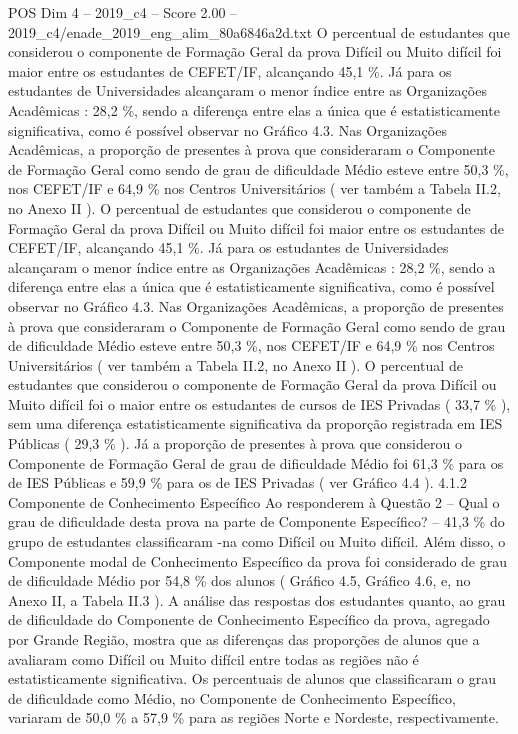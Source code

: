 \begin{textsample}{POS Dim 4 – 2019\_c4 – Score 2.00 – 2019\_c4/enade\_2019\_eng\_alim\_80a6846a2d.txt}
O percentual de estudantes que considerou o componente de Formação Geral da prova Difícil ou Muito difícil foi maior entre os estudantes de CEFET/IF, alcançando 45,1 \%.
Já para os estudantes de Universidades alcançaram o menor índice entre as Organizações Acadêmicas : 28,2 \%, sendo a diferença entre elas a única que é estatisticamente significativa, como é possível observar no Gráfico 4.3.
Nas Organizações Acadêmicas, a proporção de presentes à prova que consideraram o Componente de Formação Geral como sendo de grau de dificuldade Médio esteve entre 50,3 \%, nos CEFET/IF e 64,9 \% nos Centros Universitários ( ver também a Tabela II.2, no Anexo II ).
O percentual de estudantes que considerou o componente de Formação Geral da prova Difícil ou Muito difícil foi maior entre os estudantes de CEFET/IF, alcançando 45,1 \%.
Já para os estudantes de Universidades alcançaram o menor índice entre as Organizações Acadêmicas : 28,2 \%, sendo a diferença entre elas a única que é estatisticamente significativa, como é possível observar no Gráfico 4.3.
Nas Organizações Acadêmicas, a proporção de presentes à prova que consideraram o Componente de Formação Geral como sendo de grau de dificuldade Médio esteve entre 50,3 \%, nos CEFET/IF e 64,9 \% nos Centros Universitários ( ver também a Tabela II.2, no Anexo II ).
O percentual de estudantes que considerou o componente de Formação Geral da prova Difícil ou Muito difícil foi o maior entre os estudantes de cursos de IES Privadas ( 33,7 \% ), sem uma diferença estatisticamente significativa da proporção registrada em IES Públicas ( 29,3 \% ).
Já a proporção de presentes à prova que considerou o Componente de Formação Geral de grau de dificuldade Médio foi 61,3 \% para os de IES Públicas e 59,9 \% para os de IES Privadas ( ver Gráfico 4.4 ). 4.1.2 Componente de Conhecimento Específico Ao responderem à Questão 2 – Qual o grau de dificuldade desta prova na parte de Componente Específico? – 41,3 \% do grupo de estudantes classificaram -na como Difícil ou Muito difícil.
Além disso, o Componente modal de Conhecimento Específico da prova foi considerado de grau de dificuldade Médio por 54,8 \% dos alunos ( Gráfico 4.5, Gráfico 4.6, e, no Anexo II, a Tabela II.3 ).
A análise das respostas dos estudantes quanto, ao grau de dificuldade do Componente de Conhecimento Específico da prova, agregado por Grande Região, mostra que as diferenças das proporções de alunos que a avaliaram como Difícil ou Muito difícil entre todas as regiões não é estatisticamente significativa.
Os percentuais de alunos que classificaram o grau de dificuldade como Médio, no Componente de Conhecimento Específico, variaram de 50,0 \% a 57,9 \% para as regiões Norte e Nordeste, respectivamente.

\end{textsample}
